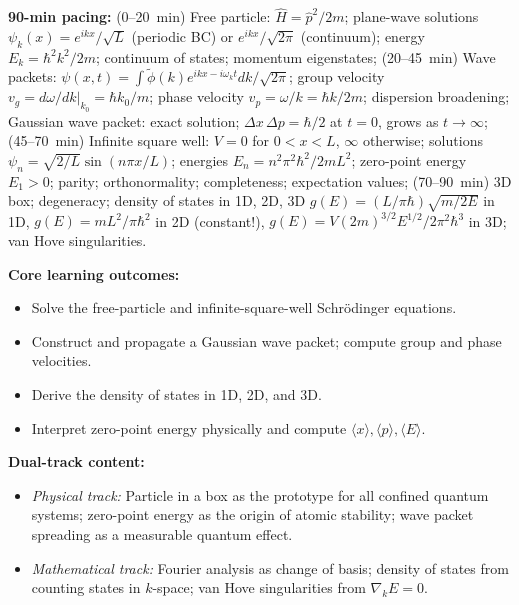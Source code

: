 \documentclass[11pt,a4paper]{article}
\begin{document}
\begin{tcolorbox}[modulebox, title={Module~I.4 / L01: Free Particle and Particle in a Box}]
\textbf{90-min pacing:} (0--20~min) Free particle: $\hat{H}=\hat{p}^2/2m$;
plane-wave solutions $\psi_k(x)=e^{ikx}/\sqrt{L}$ (periodic BC) or $e^{ikx}/\sqrt{2\pi}$ (continuum);
energy $E_k=\hbar^2k^2/2m$; continuum of states; momentum eigenstates;
(20--45~min) Wave packets: $\psi(x,t)=\int \tilde\phi(k)e^{ikx-i\omega_k t}dk/\sqrt{2\pi}$;
group velocity $v_g=d\omega/dk|_{k_0}=\hbar k_0/m$; phase velocity $v_p=\omega/k=\hbar k/2m$;
dispersion broadening; Gaussian wave packet: exact solution; $\Delta x\,\Delta p=\hbar/2$ at $t=0$,
grows as $t\to\infty$;
(45--70~min) Infinite square well: $V=0$ for $0<x<L$, $\infty$ otherwise;
solutions $\psi_n=\sqrt{2/L}\sin(n\pi x/L)$; energies $E_n=n^2\pi^2\hbar^2/2mL^2$;
zero-point energy $E_1>0$; parity; orthonormality; completeness; expectation values;
(70--90~min) 3D box; degeneracy; density of states in 1D, 2D, 3D
$g(E)=(L/\pi\hbar)\sqrt{m/2E}$ in 1D, $g(E)=mL^2/\pi\hbar^2$ in 2D (constant!),
$g(E)=V(2m)^{3/2}E^{1/2}/2\pi^2\hbar^3$ in 3D; van Hove singularities.

\medskip\textbf{Core learning outcomes:}
\begin{itemize}[leftmargin=1.4em,topsep=2pt,itemsep=1pt]
  \item Solve the free-particle and infinite-square-well Schr\"odinger equations.
  \item Construct and propagate a Gaussian wave packet; compute group and phase velocities.
  \item Derive the density of states in 1D, 2D, and 3D.
  \item Interpret zero-point energy physically and compute $\langle x\rangle,\langle p\rangle,\langle E\rangle$.
\end{itemize}

\medskip\textbf{Dual-track content:}
\begin{itemize}[leftmargin=1.4em,topsep=2pt,itemsep=1pt]
  \item \textit{Physical track:} Particle in a box as the prototype for all confined quantum systems;
    zero-point energy as the origin of atomic stability; wave packet spreading as a measurable quantum effect.
  \item \textit{Mathematical track:} Fourier analysis as change of basis; density of states from counting
    states in $k$-space; van Hove singularities from $\nabla_k E=0$.
\end{itemize}


\end{tcolorbox}
\end{document}
